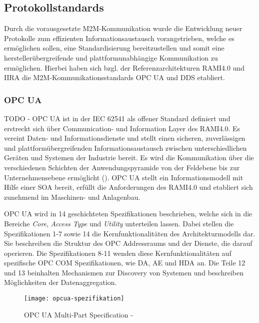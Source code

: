 \subsection{Protokollstandards}
Durch die vorausgesetzte M2M-Kommunikation wurde die Entwicklung neuer Protokolle zum effizienten Informationsaustausch vorangetrieben, welche es ermöglichen sollen, eine Standardisierung bereitzustellen und somit eine herstellerübergreifende und plattformunabhängige Kommunikation zu ermöglichen. Hierbei haben sich bzgl. der Referenzarchitekturen \ac{RAMI4.0} und \ac{IIRA} die \ac{M2M}-Kommunikationsstandards \ac{OPC UA} und \ac{DDS} etabliert.

\subsubsection{\ac{OPC UA}}
TODO - \ac{OPC UA} ist in der \ac{IEC} 62541 als offener Standard definiert und erstreckt sich über Communication- und Information Layer des \ac{RAMI4.0}. Es vereint Daten- und Informationsdienste und stellt einen sicheren, zuverlässigen und plattformübergreifenden Informationsaustausch zwischen unterschiedlichen Geräten und Systemen der Industrie bereit. Es wird die Kommunikation über die verschiedenen Schichten der Anwendungspyramide von der Feldebene bis zur Unternehmensebene ermöglicht (\cite{OPCWegbereiter2014}). \ac{OPC UA} stellt ein Informationsmodell mit Hilfe einer \ac{SOA} bereit, erfüllt die Anforderungen des \ac{RAMI4.0} und etabliert sich zunehmend im Maschinen- und Anlagenbau.

\ac{OPC UA} wird in 14 geschichteten Spezifikationen beschrieben, welche sich in die Bereiche \textit{Core}, \textit{Access Type} und \textit{Utility} unterteilen lassen. Dabei stellen die Spezifikationen 1-7 sowie 14 die Kernfunktionalitäten des Architekturmodells dar. Sie beschreiben die Struktur des OPC Addressraums und der Dienste, die darauf operieren. Die Spezifikationen 8-11 wenden diese Kernfunktionalitäten auf spezifische \ac{OPC COM} Spezifikationen, wie \ac{DA}, \ac{AE} und \ac{HDA} an. Die Teile 12 und 13 beinhalten Mechanismen zur Discovery von Systemen und beschreiben Möglichkeiten der Datenaggregation.

\begin{figure}[h]
  \centering
  \texttt{[image: opcua-spezifikation]}
  \caption{OPC UA Multi-Part Specification - \cite{opcpt1}} 
  \label{Kap2:OPC UA Multi-Part Specification}
\end{figure}

